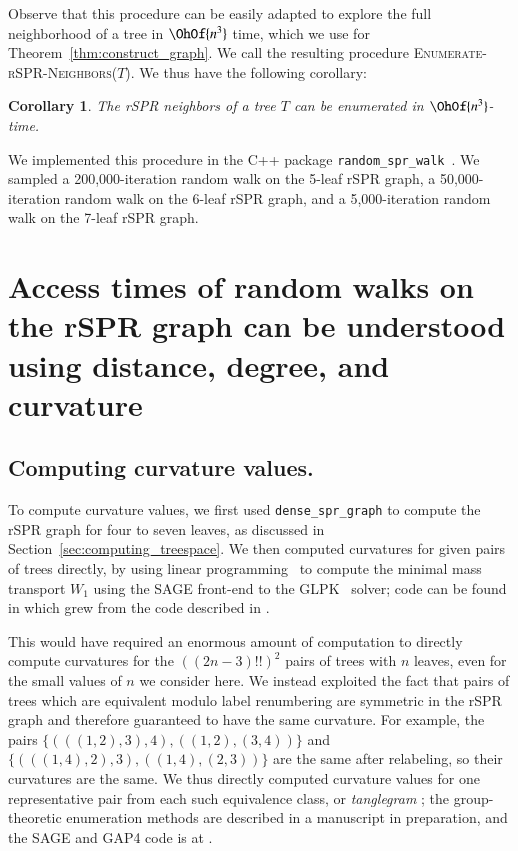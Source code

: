 \documentclass[]{elsarticle}
\newtheorem{cor}[thm]{Corollary}
\begin{document}
Observe that this procedure can be easily adapted to explore the full neighborhood of a tree in $\OhOf{n^3}$ time, which we use for Theorem~\ref{thm:construct_graph}. We call the resulting procedure \textsc{Enumerate-rSPR-Neighbors($T$)}.
We thus have the following corollary:

\begin{cor}
\label{cor:enumerate_neighbors}
	The rSPR neighbors of a tree $T$ can be enumerated in $\OhOf{n^3}$-time.
\end{cor}

We implemented this procedure in the C++ package \texttt{random\_spr\_walk}~\citep{random_spr_walk}.
We sampled a 200,000-iteration random walk on the 5-leaf rSPR graph, a 50,000-iteration random walk on the 6-leaf rSPR graph, and a 5,000-iteration random walk on the 7-leaf rSPR graph.

\section{Access times of random walks on the rSPR graph can be understood using distance, degree, and curvature}

\subsection{Computing curvature values.}
\label{sec:results:curvature}
To compute curvature values, we first used \texttt{dense\_spr\_graph} to compute the rSPR graph for four to seven leaves, as discussed in Section~\ref{sec:computing_treespace}.
We then computed curvatures for given pairs of trees directly, by using linear programming~\citep{Loisel2014-hu} to compute the minimal mass transport $W_1$ using the SAGE \citep{SAGE} front-end to the GLPK~\citep{glpk} solver; code can be found in \citep{gricci} which grew from the code described in \citep{Loisel2014-hu}.

This would have required an enormous amount of computation to directly compute curvatures for the $((2n-3)!!)^2$ pairs of trees with $n$ leaves, even for the small values of $n$ we consider here.
We instead exploited the fact that pairs of trees which are equivalent modulo label renumbering are symmetric in the rSPR graph and therefore guaranteed to have the same curvature.
For example, the pairs
$\{(((1,2),3),4), ((1,2),(3,4))\}$ and
$\{(((1,4),2),3), ((1,4),(2,3))\}$
are the same after relabeling, so their curvatures are the same.
We thus directly computed curvature values for one representative pair from each such equivalence class, or \emph{tanglegram} \citep{Venkatachalam2010-zh}; the group-theoretic enumeration methods are described in a manuscript in preparation, and the SAGE \citep{SAGE} and GAP4 \citep{GAP4} code is at \citep{tangle}.
\end{document}
